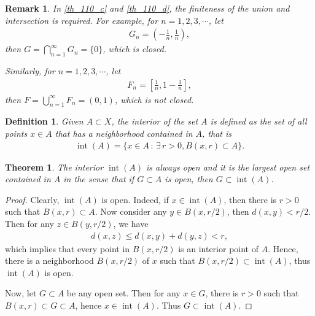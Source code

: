 \documentclass[11pt]{book}
\newtheorem{definition}{Definition}[chapter]
\newtheorem{theorem}{Theorem}[chapter]
\newtheorem{remark}{Remark}[chapter]
\theoremstyle{definition}
\numberwithin{equation}{chapter}
\begin{document}
\begin{remark}
In \ref{th_110_c} and \ref{th_110_d}, the finiteness of the union and intersection is required. For example, for $n = 1,2,3,\cdots$, let 
\begin{align*}
    G_n = \left(- \frac{1}{n}, \frac{1}{n}\right), 
\end{align*}
then $G = \bigcap^\infty_{n=1} G_n = \{0\}$, which is closed.  

Similarly, for $n = 1,2,3,\cdots$, let  
\begin{align*}
    F_n = \left[\frac{1}{n}, 1 - \frac{1}{n}\right],
\end{align*}
then $F = \bigcup^\infty_{n=1} F_n = (0,1)$, which is not closed.
\end{remark}

\medskip

\begin{definition}
Given $A \subset X$, the interior of the set $A$ is defined as the set of all points $x \in A$ that has a neighborhood contained in $A$, that is
\begin{align*}
    \operatorname{int}(A) = \{x \in A \,:\, \exists \, r > 0, B(x,r) \subset A\}.
\end{align*}
\end{definition}

\medskip

\begin{theorem}
The interior $\operatorname{int}(A)$ is always open and it is the largest open set contained in $A$ in the sense that if $G \subset A$ is open, then $G \subset \operatorname{int}(A)$.
\end{theorem}
\begin{proof}
Clearly, $\operatorname{int}(A)$ is open. Indeed, if $x \in \operatorname{int}(A)$, then there is $r > 0$ such that $B(x,r) \subset A$. Now consider any $y \in B(x,r/2)$, then $d(x,y) < r/2$. Then for any $z \in B(y, r/2)$, we have
\begin{align*}
    d(x,z) \leq d(x,y) + d(y,z) < r,
\end{align*}
which implies that every point in $B(x,r/2)$ is an interior point of $A$. Hence, there is a neighborhood $B(x,r/2)$ of $x$ such that $B(x,r/2) \subset \operatorname{int}(A)$, thus $\operatorname{int}(A)$ is open.

Now, let $G \subset A$ be any open set. Then for any $x \in G$, there is $r > 0$ such that $B(x,r) \subset G \subset A$, hence $x \in \operatorname{int}(A)$. Thus $G \subset \operatorname{int}(A)$.
\end{proof}
\end{document}
